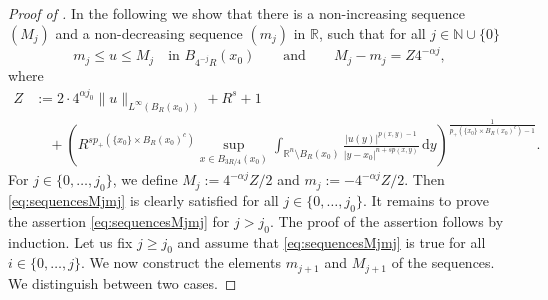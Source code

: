 \documentclass[11pt]{amsart}
\theoremstyle{plain}
\theoremstyle{definition}
\numberwithin{equation}{section}
\newcommand{\N}{\mathbb{N}}
\newcommand{\R}{\mathbb{R}}
\begin{document}
\begin{proof} [Proof of ]
In the following we show that there is a non-increasing sequence $(M_j)$ and a non-decreasing sequence $(m_j)$ in $\R$, such that for all $j\in\N\cup\{0\}$ 
\begin{equation}\label{eq:sequencesMjmj}
m_j \leq u \leq M_j \quad \text{in } B_{4^{-j}R}(x_0) \qquad \text{and} \qquad M_j - m_j = Z4^{-\alpha j},
\end{equation}
where 
\begin{align*}
Z&:= 2\cdot 4^{\alpha j_0} \|u\|_{L^{\infty}(B_R(x_0))} + R^s + 1 \\
& \quad + \left(R^{sp_{+}(\{x_0\}\times B_R(x_0)^c)} \sup_{x \in B_{3R/4}(x_0)} \int_{\mathbb{R}^n \setminus B_R(x_0)} \frac{|u(y)|^{p(x,y)-1}}{|y-x_0|^{n+sp(x,y)}} \,\mathrm{d}y\right)^{\frac{1}{p_{+}(\{x_0\}\times B_R(x_0)^c)-1}} . 
\end{align*}
For $j\in \{0,\dots,j_0\}$, we define $M_j:=4^{-\alpha j} Z/2$ and $m_j:=-4^{-\alpha j} Z/2$. Then \eqref{eq:sequencesMjmj} is clearly satisfied for all $j\in \{0,\dots,j_0\}$. It remains to prove the assertion \eqref{eq:sequencesMjmj} for $j > j_0$. 
The proof of the assertion follows by induction. Let us fix $j\geq j_0$ and assume that \eqref{eq:sequencesMjmj} is true for all $i\in \{0,\dots,j\}$. We now construct the elements $m_{j+1}$ and $M_{j+1}$ of the sequences. We distinguish between two cases.  


\end{proof}
\end{document}
